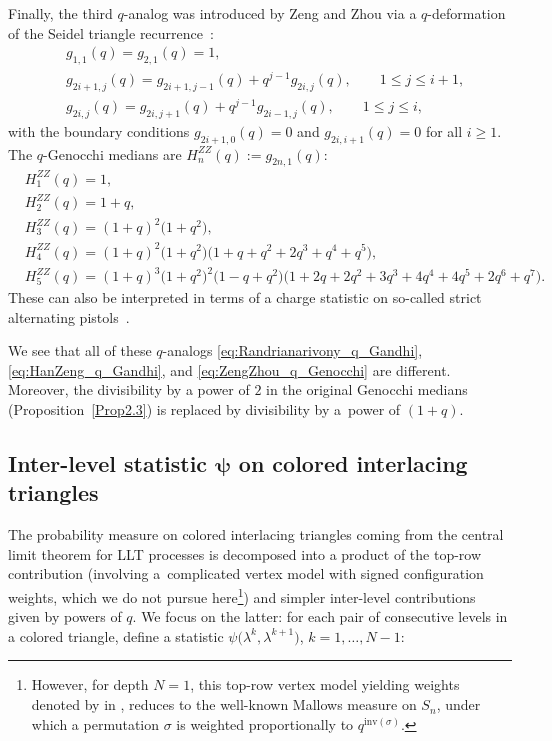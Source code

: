 \documentclass[pdftex]{sigma}
\numberwithin{equation}{section}
\theoremstyle{definition}
\begin{document}
Finally, the third $q$-analog was introduced by Zeng and Zhou
\cite{ZengZhou2006} via a $q$-deformation of the Seidel triangle recurrence~\cite{Seidel1877}:
\begin{align*}
	&g_{1,1}(q)= g_{2,1}(q)=1,\\
	&g_{2i+1,j}(q)= g_{2i+1,j-1}(q)+q^{j-1}g_{2i,j}(q), \qquad 1\le j\le i+1, \\
	&g_{2i,j}(q)= g_{2i,j+1}(q)+q^{j-1} g_{2i-1,j}(q), \qquad 1\le j\le i,
\end{align*}
with the boundary conditions $g_{2i+1,0}(q)=0$ and $g_{2i,i+1}(q)=0$ for all
$i\ge1$.
The $q$-Genocchi medians are $H_n^{ZZ}(q) := g_{2n,1}(q)$:
\begin{equation}
	\label{eq:ZengZhou_q_Genocchi}
	\begin{split}
		&H_1^{ZZ}(q)= 1, \\ &H_2^{ZZ}(q)= 1 + q, \\ &H_3^{ZZ}(q)= (1 + q)^2 \bigl(1 + q^2\bigr), \\
		&H_4^{ZZ}(q)= (1 + q)^2 \bigl(1 + q^2\bigr) \bigl(1 + q + q^2 + 2q^3 + q^4 + q^5\bigr), \\
		&H_5^{ZZ}(q)= (1 + q)^3 \bigl(1 + q^2\bigr)^2 \bigl(1 - q + q^2\bigr) \bigl(1 + 2q + 2q^2 + 3q^3
		+ 4q^4 + 4q^5 + 2q^6 + q^7\bigr).
	\end{split}
\end{equation}
These can also be interpreted in terms of a charge statistic on so-called strict
alternating pistols~\cite{ZengZhou2006}.

We see that all of these $q$-analogs \eqref{eq:Randrianarivony_q_Gandhi},
\eqref{eq:HanZeng_q_Gandhi}, and
\eqref{eq:ZengZhou_q_Genocchi}
are different.
Moreover, the divisibility by a power of $2$ in the original Genocchi medians
(Proposition~\ref{Prop2.3}) is replaced by divisibility by a~power of
$(1+q)$.

\subsection[Inter-level statistic psi on colored interlacing triangles]{Inter-level statistic $\boldsymbol{\psi}$ on colored interlacing triangles}
\label{subsec:inter_level_statistic}

The probability measure on colored interlacing triangles coming from the central
limit theorem for LLT processes
\cite{ABW2023coloured_LLT}
is decomposed into a product of the top-row contribution (involving a~complicated vertex model with signed configuration weights, which we do not
pursue here\footnote{However, for depth $N=1$, this top-row vertex model yielding weights denoted by  in \cite{ABW2023coloured_LLT},
reduces to the well-known Mallows measure on $S_n$, under which a permutation
$\sigma$ is weighted proportionally to $q^{\mathrm{inv}(\sigma)}$.}) and simpler
inter-level contributions given by powers of $q$.
We focus on the latter: for each pair of consecutive levels in a colored
triangle, define a statistic $\psi\bigl(\lambda^{k}, \lambda^{k+1}\bigr)$, $k=1,\dots,N-1$:
\end{document}
